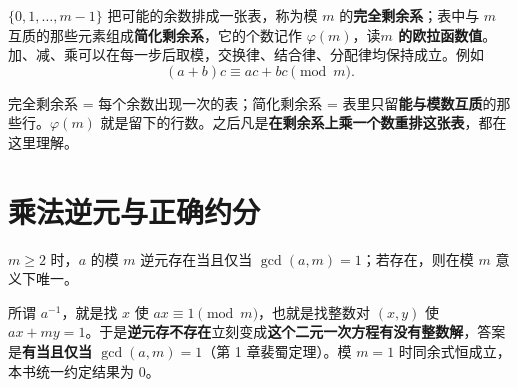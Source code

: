 $\{0,1,\ldots,m-1\}$ 把可能的余数排成一张表，称为模 $m$ 的\textbf{完全剩余系}；表中与 $m$ 互质的那些元素组成\textbf{简化剩余系}，它的个数记作 $\varphi(m)$，读\textbf{$m$ 的欧拉函数值}。
加、减、乘可以在每一步后取模，交换律、结合律、分配律均保持成立。例如
\[
 (a+b)c\equiv ac+bc\pmod m.
\]

\begin{tip}[剩余系 = 一张余数表]
完全剩余系 = 每个余数出现一次的表；简化剩余系 = 表里只留\textbf{能与模数互质}的那些行。$\varphi(m)$ 就是留下的行数。之后凡是\textbf{在剩余系上乘一个数}\textbf{重排这张表}，都在这里理解。
\end{tip}


\section{乘法逆元与正确约分}
\begin{theorem}
$m\ge2$ 时，$a$ 的模 $m$ 逆元存在当且仅当 $\gcd(a,m)=1$；若存在，则在模 $m$ 意义下唯一。
\end{theorem}

\begin{tip}
所谓 $a^{-1}$，就是找 $x$ 使 $ax\equiv1\pmod m$，也就是找整数对 $(x,y)$ 使 $ax+my=1$。于是\textbf{逆元存不存在}立刻变成\textbf{这个二元一次方程有没有整数解}，答案是\textbf{有当且仅当 $\gcd(a,m)=1$}（第 1 章裴蜀定理）。模 $m=1$ 时同余式恒成立，本书统一约定结果为 $0$。
\end{tip}

